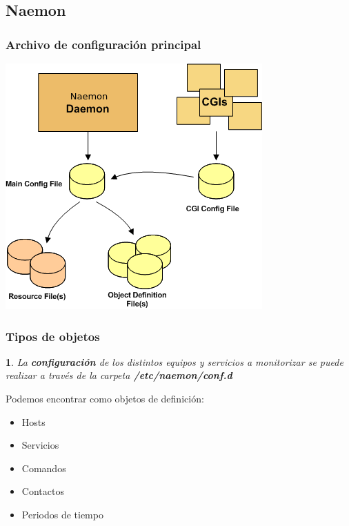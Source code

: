 \documentclass{beamer}
\theoremstyle{plain}
\theoremstyle{definition}
\theoremstyle{plain}
\newtheorem{prop}[thm]{}
\theoremstyle{definition}
\theoremstyle{remark}
\theoremstyle{definition}
\begin{document}
\subsection{Naemon}
\begin{frame}
	\frametitle{Archivo de configuración principal}
	\centering
	\includegraphics[scale=0.5]{imagenes/main_configuring.png}
		
\end{frame}

\begin{frame}
	\frametitle{Tipos de objetos}
	\begin{prop}
		La \textbf{configuración} de los distintos equipos y servicios a monitorizar se puede realizar a través de la carpeta \textbf{/etc/naemon/conf.d}
	\end{prop}
Podemos encontrar como objetos de definición:
\begin{itemize}
	\item Hosts
	\item Servicios
	\item Comandos
	\item Contactos
	\item Periodos de tiempo
\end{itemize}
	
\end{frame}
\end{document}

